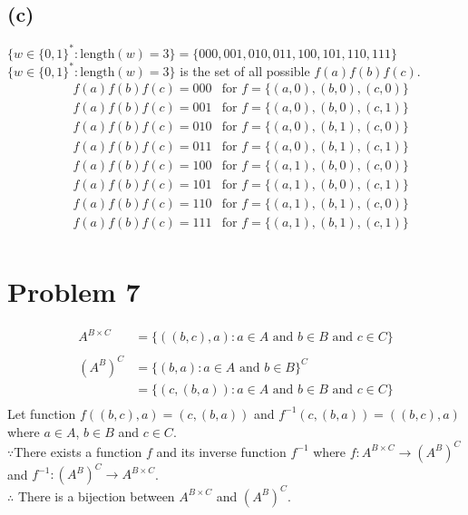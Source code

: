 \documentclass{article} %
\begin{document}
\subsection*{(c)}
$\{\mathit{w}\in\{0,1\}^{*}:\mathrm{length}(\mathit{w})=3\}=\{000,001,010,011,100,101,110,111\}$\\
$\{\mathit{w}\in\{0,1\}^{*}:\mathrm{length}(\mathit{w})=3\}$ is the set of all possible $\mathit{f}(a)\mathit{f}(b)\mathit{f}(c)$.
\[\begin{array}{rlcr}
&\mathit{f}(a)\mathit{f}(b)\mathit{f}(c)=000	&\mbox{for }\mathit{f}=\{(a,0),(b,0),(c,0)\}\\
&\mathit{f}(a)\mathit{f}(b)\mathit{f}(c)=001	&\mbox{for }\mathit{f}=\{(a,0),(b,0),(c,1)\}\\
&\mathit{f}(a)\mathit{f}(b)\mathit{f}(c)=010	&\mbox{for }\mathit{f}=\{(a,0),(b,1),(c,0)\}\\
&\mathit{f}(a)\mathit{f}(b)\mathit{f}(c)=011	&\mbox{for }\mathit{f}=\{(a,0),(b,1),(c,1)\}\\
&\mathit{f}(a)\mathit{f}(b)\mathit{f}(c)=100	&\mbox{for }\mathit{f}=\{(a,1),(b,0),(c,0)\}\\
&\mathit{f}(a)\mathit{f}(b)\mathit{f}(c)=101	&\mbox{for }\mathit{f}=\{(a,1),(b,0),(c,1)\}\\
&\mathit{f}(a)\mathit{f}(b)\mathit{f}(c)=110	&\mbox{for }\mathit{f}=\{(a,1),(b,1),(c,0)\}\\
&\mathit{f}(a)\mathit{f}(b)\mathit{f}(c)=111	&\mbox{for }\mathit{f}=\{(a,1),(b,1),(c,1)\}\\
\end{array}\]
\section*{Problem 7}
\[\begin{array}{rlcr}
A^{B\times C}&=\{((b,c),a):a\in A \mbox{ and } b\in B \mbox{ and } c\in C\}\\
\\
(A^{B})^{C}	&=\{(b,a):a\in A \mbox{ and } b\in B\}^{C}\\
			&=\{(c,(b,a)):a\in A \mbox{ and } b\in B \mbox{ and } c\in C\}\\
\end{array}\]
Let function $\mathit{f}((b,c),a)=(c,(b,a))$ and $\mathit{f}^{-1}(c,(b,a))=((b,c),a)$ where $a\in A$, $b \in B$ and $c \in C$.\\
$\because$There exists a function $\mathit{f}$ and its inverse function $\mathit{f}^{-1}$ where $\mathit{f}:A^{B\times C} \to (A^{B})^{C}$ and $\mathit{f}^{-1}:(A^{B})^{C} \to A^{B\times C}$.\\ 
$\therefore$ There is a bijection between $A^{B\times C}$ and $(A^{B})^{C}$.\\
\end{document}
